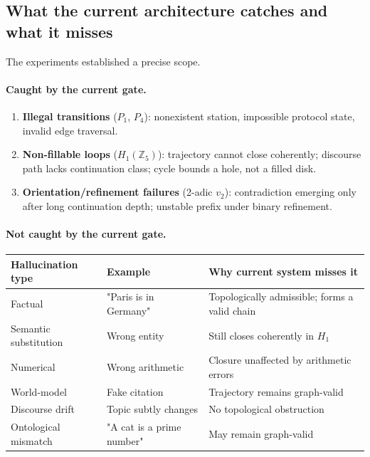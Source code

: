 \documentclass[11pt,a4paper]{article}
\begin{document}
\subsection*{What the current architecture catches and what it misses}

The experiments established a precise scope.

\paragraph{Caught by the current gate.}
\begin{enumerate}[label=(\roman*)]
  \item \textbf{Illegal transitions} ($P_1$, $P_4$): nonexistent station,
        impossible protocol state, invalid edge traversal.
  \item \textbf{Non-fillable loops} ($H_1(\mathbb{Z}_5)$): trajectory
        cannot close coherently; discourse path lacks continuation class;
        cycle bounds a hole, not a filled disk.
  \item \textbf{Orientation/refinement failures} (2-adic $v_2$):
        contradiction emerging only after long continuation depth;
        unstable prefix under binary refinement.
\end{enumerate}

\paragraph{Not caught by the current gate.}

\begin{center}
\renewcommand{\arraystretch}{1.3}\small
\begin{tabularx}{\linewidth}{p{3.5cm}p{4cm}X}
\toprule
\textbf{Hallucination type} & \textbf{Example} & \textbf{Why current system misses it} \\
\midrule
Factual & "Paris is in Germany" &
  Topologically admissible; forms a valid chain \\
Semantic substitution & Wrong entity & Still closes coherently in $H_1$ \\
Numerical & Wrong arithmetic & Closure unaffected by arithmetic errors \\
World-model & Fake citation & Trajectory remains graph-valid \\
Discourse drift & Topic subtly changes & No topological obstruction \\
Ontological mismatch & "A cat is a prime number" & May remain graph-valid \\
\bottomrule
\end{tabularx}
\end{center}
\end{document}
